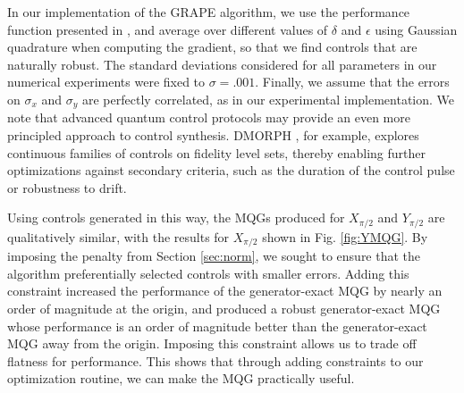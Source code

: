 \documentclass[aps,nofootinbib,pra,notitlepage,twocolumn]{revtex4-1}
\newcommand{\0}{\ensuremath{\mathbf{0}}}
\providecommand{\DIFaddend}{} %
\DeclareRobustCommand{\DIFaddend}{\DIFOaddend \let\includegraphics\DIFOincludegraphics} %
\begin{document}
{\DIFaddend In our implementation of the GRAPE algorithm, we use the performance function presented in \cite{Khaneja2005}, and average over different values of $\delta$ and $\epsilon$ using Gaussian quadrature when computing the gradient, so that we find controls that are naturally robust. The standard deviations considered for all parameters in our numerical experiments were fixed to $\sigma=.001$. Finally, we assume that the errors on $\sigma_x$ and $\sigma_y$ are perfectly correlated, as in our experimental implementation. We note that advanced quantum control protocols may provide an even more principled approach to control synthesis. DMORPH \cite{dominy2008exploring}, for example, explores continuous families of controls on fidelity level sets, thereby enabling further optimizations against secondary criteria, such as the duration of the control pulse or robustness to drift. 

Using controls generated in this way, the MQGs produced for $X_{\pi/2}$ and $Y_{\pi/2}$ are qualitatively similar, with the results for $X_{\pi/2}$ shown in Fig. \ref{fig:YMQG}. By imposing the penalty from Section \ref{sec:norm}, we sought to ensure that the algorithm preferentially selected controls with smaller errors. Adding this constraint increased the performance of the generator-exact MQG by nearly an order of magnitude at the origin, and produced a robust generator-exact MQG whose performance is an order of magnitude better than the generator-exact MQG away from the origin. Imposing this constraint allows us to trade off flatness for performance. This shows that through adding constraints to our optimization routine, we can make the MQG practically useful. 

}
\end{document}
